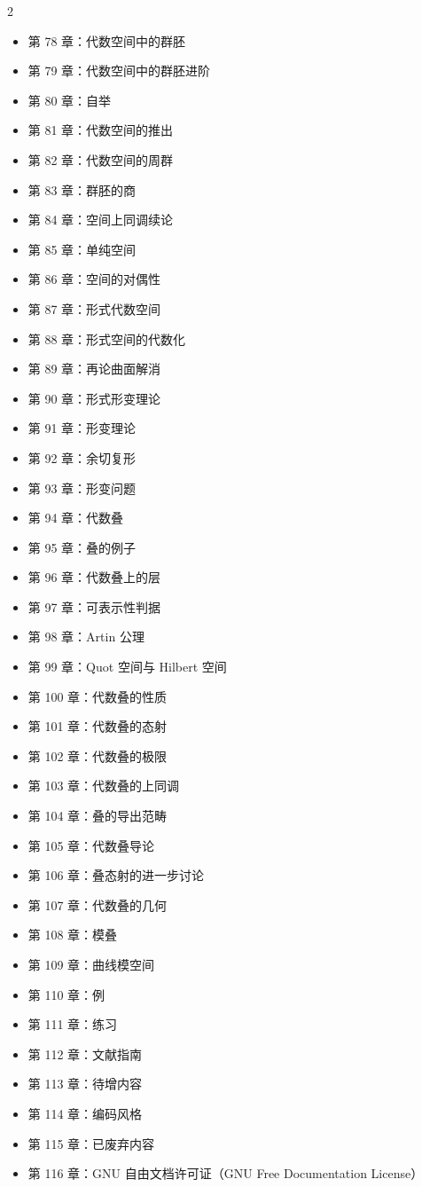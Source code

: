 \begin{multicols}{2}
\begin{itemize}
\item 第 78 章：代数空间中的群胚
\item 第 79 章：代数空间中的群胚进阶
\item 第 80 章：自举
\item 第 81 章：代数空间的推出
\item 第 82 章：代数空间的周群
\item 第 83 章：群胚的商
\item 第 84 章：空间上同调续论
\item 第 85 章：单纯空间
\item 第 86 章：空间的对偶性
\item 第 87 章：形式代数空间
\item 第 88 章：形式空间的代数化
\item 第 89 章：再论曲面解消
\item 第 90 章：形式形变理论
\item 第 91 章：形变理论
\item 第 92 章：余切复形
\item 第 93 章：形变问题
\item 第 94 章：代数叠
\item 第 95 章：叠的例子
\item 第 96 章：代数叠上的层
\item 第 97 章：可表示性判据
\item 第 98 章：Artin 公理
\item 第 99 章：Quot 空间与 Hilbert 空间
\item 第 100 章：代数叠的性质
\item 第 101 章：代数叠的态射
\item 第 102 章：代数叠的极限
\item 第 103 章：代数叠的上同调
\item 第 104 章：叠的导出范畴
\item 第 105 章：代数叠导论
\item 第 106 章：叠态射的进一步讨论
\item 第 107 章：代数叠的几何
\item 第 108 章：模叠
\item 第 109 章：曲线模空间
\item 第 110 章：例
\item 第 111 章：练习
\item 第 112 章：文献指南
\item 第 113 章：待增内容
\item 第 114 章：编码风格
\item 第 115 章：已废弃内容
\item 第 116 章：GNU 自由文档许可证（GNU Free Documentation License）
\end{itemize}
\end{multicols}

